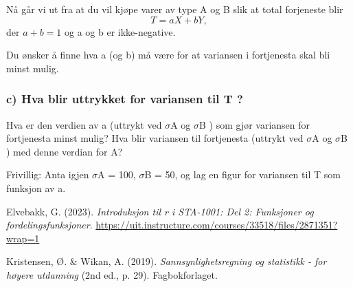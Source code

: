 \documentclass[
  12pt,
  a4paper,
  DIV=11,
  numbers=noendperiod]{scrartcl}
\newlength{\cslhangindent}
\newenvironment{CSLReferences}[2] %
 {\begin{list}{}{%
  \setlength{\itemindent}{0pt}
  \setlength{\leftmargin}{0pt}
  \setlength{\parsep}{0pt}
  \ifodd #1
   \setlength{\leftmargin}{\cslhangindent}
   \setlength{\itemindent}{-1\cslhangindent}
  \fi
  \setlength{\itemsep}{#2\baselineskip}}}
 {\end{list}}
\begin{document}
Nå går vi ut fra at du vil kjøpe varer av type A og B slik at total
forjeneste blir \[
T = aX + bY,
\] der \(a + b = 1\) og a og b er ikke-negative.

Du ønsker å finne hva a (og b) må være for at variansen i fortjenesta
skal bli minst mulig.

\subsubsection{c) Hva blir uttrykket for variansen til T
?}\label{c-hva-blir-uttrykket-for-variansen-til-t}

Hva er den verdien av a (uttrykt ved \(\sigma\)A og \(\sigma\)B ) som
gjør variansen for fortjenesta minst mulig? Hva blir variansen til
fortjenesta (uttrykt ved \(\sigma\)A og \(\sigma\)B ) med denne verdian
for A?

Frivillig: Anta igjen \(\sigma\)A = 100, \(\sigma\)B = 50, og lag en
figur for variansen til T som funksjon av a.

\label{refs}
\begin{CSLReferences}{1}{0}
Elvebakk, G. (2023). \emph{Introduksjon til r i STA-1001: Del 2:
Funksjoner og fordelingsfunksjoner}.
\url{https://uit.instructure.com/courses/33518/files/2871351?wrap=1}

Kristensen, Ø. \& Wikan, A. (2019). \emph{Sannsynlighetsregning og
statistikk - for høyere utdanning} (2nd ed., p. 29). Fagbokforlaget.

\end{CSLReferences}
\end{document}
